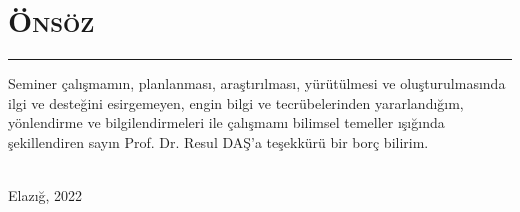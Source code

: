 \chapter*{\Large\textbf{\textsc{\"{O}ns\"{o}z}}}

\vspace{-0.6cm}
\rule{\textwidth}{0.3pt}\vspace{-0.35cm}

\begin{justify}

\begin{footnotesize}

\setlength{\parindent}{1cm}
\hspace{1cm}Seminer çalışmamın, planlanması, araştırılması, yürütülmesi ve oluşturulmasında ilgi ve desteğini esirgemeyen, engin bilgi ve tecrübelerinden yararlandığım, yönlendirme ve bilgilendirmeleri ile çalışmamı bilimsel temeller ışığında şekillendiren sayın Prof. Dr. Resul DAŞ’a teşekkürü bir borç bilirim.\\

\end{footnotesize}
\end{justify}

\raggedleft{\small\textbf{\tezyazari}}\\
{\small Elazığ, 2022}    %

\newpage